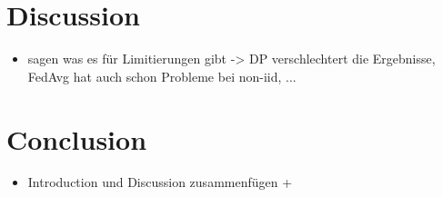 \chapter{Discussion}

\begin{itemize}
	\item sagen was es für Limitierungen gibt -> DP verschlechtert die Ergebnisse, FedAvg hat auch schon Probleme bei non-iid, ...
\end{itemize}


\chapter{Conclusion}

\begin{itemize}
	\item Introduction und Discussion zusammenfügen + 
\end{itemize}